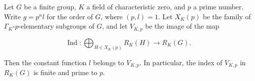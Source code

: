 Let $G$ be a finite group, $K$ a field of characteristic zero, and $p$ a prime number. Write $g = p^n l$ for the order of $G$, where $(p, l) = 1$. Let $X_K(p)$ be the family of $\Gamma_K$-$p$-elementary subgroups of $G$, and let $V_{K,p}$ be the image of the map

$$\operatorname{Ind} : \bigoplus_{H \in X_K(p)} R_K(H) \rightarrow R_K(G).$$

Then the constant function $l$ belongs to $V_{K,p}$. In particular, the index of $V_{K,p}$ in $R_K(G)$ is finite and prime to $p$.
